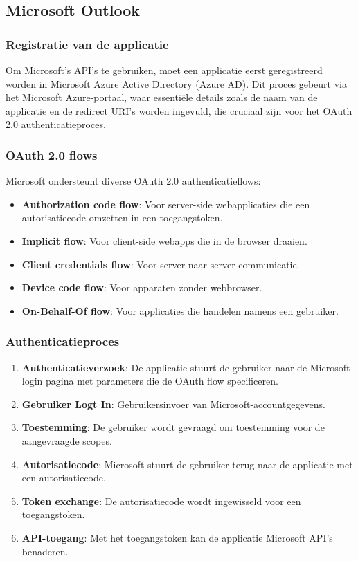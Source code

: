 \newpage



\subsection{Microsoft Outlook}
\subsubsection{Registratie van de applicatie}
Om Microsoft's API's te gebruiken, moet een applicatie eerst geregistreerd worden in Microsoft Azure Active Directory (Azure AD). Dit proces gebeurt via het Microsoft Azure-portaal, waar essentiële details zoals de naam van de applicatie en de redirect URI's worden ingevuld, die cruciaal zijn voor het OAuth 2.0 authenticatieproces.

\subsubsection{OAuth 2.0 flows}
Microsoft ondersteunt diverse OAuth 2.0 authenticatieflows:
\begin{itemize}
    \item \textbf{Authorization code flow}: Voor server-side webapplicaties die een autorisatiecode omzetten in een toegangstoken.
    \item \textbf{Implicit flow}: Voor client-side webapps die in de browser draaien.
    \item \textbf{Client credentials flow}: Voor server-naar-server communicatie.
    \item \textbf{Device code flow}: Voor apparaten zonder webbrowser.
    \item \textbf{On-Behalf-Of flow}: Voor applicaties die handelen namens een gebruiker.
\end{itemize}

\subsubsection{Authenticatieproces}
\begin{enumerate}
    \item \textbf{Authenticatieverzoek}: De applicatie stuurt de gebruiker naar de Microsoft login pagina met parameters die de OAuth flow specificeren.
    \item \textbf{Gebruiker Logt In}: Gebruikersinvoer van Microsoft-accountgegevens.
    \item \textbf{Toestemming}: De gebruiker wordt gevraagd om toestemming voor de aangevraagde scopes.
    \item \textbf{Autorisatiecode}: Microsoft stuurt de gebruiker terug naar de applicatie met een autorisatiecode.
    \item \textbf{Token exchange}: De autorisatiecode wordt ingewisseld voor een toegangstoken.
    \item \textbf{API-toegang}: Met het toegangstoken kan de applicatie Microsoft API's benaderen.
\end{enumerate}

